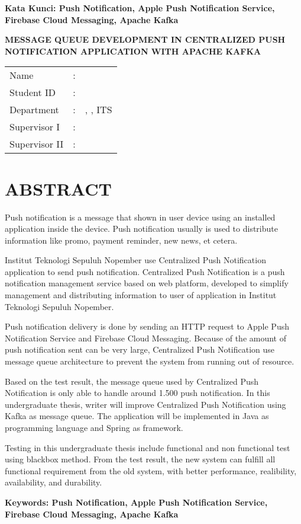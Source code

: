\vspace*{1em}
\noindent\bfseries Kata Kunci: Push Notification, Apple Push Notification Service, Firebase Cloud Messaging, Apache Kafka
\normalfont
\cleardoublepage

\begin{center}
	\noindent\textbf{\MakeUppercase{Message Queue Development in Centralized Push Notification Application with Apache Kafka}}
\end{center}
\vspace*{1em}

\noindent\begin{tabularx}{\linewidth}{l l X}
	Name 			& : & \penulis \\
	Student ID		& :	& \nrp \\
	Department 		& : & \jurusaneng, \newline \fakultaseng, ITS \\
	Supervisor I 	& : & \pembimbingsatu \\
	Supervisor II 	& : & \pembimbingdua
\end {tabularx}

{\let\clearpage\relax\titlespacing{\chapter}{0em}{0em}{1em} \chapter{ABSTRACT}}
\itshape
\par Push notification is a message that shown in user device using an installed application inside the device. Push notification usually is used to distribute information like promo, payment reminder, new news, et cetera.
\par Institut Teknologi Sepuluh Nopember use Centralized Push Notification application to send push notification. Centralized Push Notification is a push notification management service based on web platform, developed to simplify management and distributing information to user of application in Institut Teknologi Sepuluh Nopember.
\par Push notification delivery is done by sending an HTTP request to Apple Push Notification Service and Firebase Cloud Messaging. Because of the amount of push notification sent can be very large, Centralized Push Notification use message queue architecture to prevent the system from running out of resource.
\par Based on the test result, the message queue used by Centralized Push Notification is only able to handle around 1.500 push notification. In this undergraduate thesis, writer will improve Centralized Push Notification using Kafka as message queue. The application will be implemented in Java as programming language and Spring as framework.
\par Testing in this undergraduate thesis include functional and non functional test using blackbox method. From the test result, the new system can fulfill all functional requirement from the old system, with better performance, realibility, availability, and durability.

\vspace*{1em}
\noindent\bfseries Keywords: Push Notification, Apple Push Notification Service, Firebase Cloud Messaging, Apache Kafka
\normalfont
\cleardoublepage